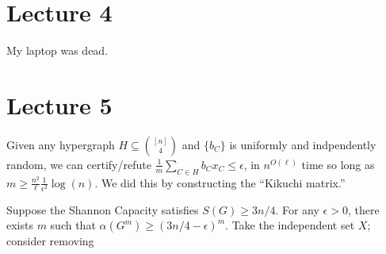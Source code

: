 \section{Lecture 4}
My laptop was dead.

\section{Lecture 5}
Given any hypergraph $H \subseteq \binom{[n]}{4}$ and
$\{ b_C \}$ is uniformly and indpendently random,
we can certify/refute $\frac{1}{m} \sum_{C \in H} b_C x_C \le \epsilon$,
in $n^{O(\ell)}$ time so long as $m \ge \frac{n^2}{\ell} \frac{1}{\epsilon^2} \log(n)$.
We did this by constructing the ``Kikuchi matrix.''

Suppose the Shannon Capacity satisfies $S(G) \ge 3n/4$.
For any $\epsilon > 0$,
there exists $m$ such that $\alpha(G^m) \ge (3n/4 - \epsilon)^m$.
Take the independent set $X$; consider
removing 

